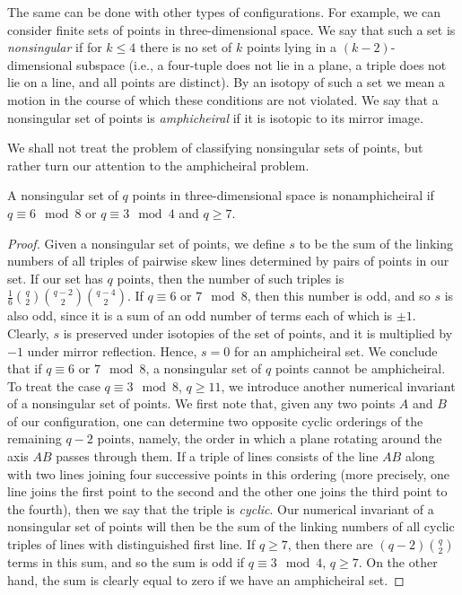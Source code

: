\documentclass{article}
\begin{document}
The same can be done with other types of configurations. For example, we can
consider finite sets of points in three-dimensional space. We say that such a
set is {\it nonsingular\/} if for $k\le 4$ there is no set of $k$ points lying
in a $(k-2)$-dimensional subspace (i.e., a four-tuple does not lie in a plane,
a triple does not lie on a line, and all points are distinct). By an isotopy of
such a set we mean a motion in the course of which these conditions are not
violated. We say that a nonsingular set of points is {\it 
amphicheiral\/} if it is isotopic to its mirror image.

We shall not treat the problem of classifying nonsingular sets of points, but
rather turn our attention to the amphicheiral problem.

\begin{Th} 
 A nonsingular set of $q$ points in 
three-dimensional space is
nonamphicheiral if $q\equiv 6\mod8$ or $q\equiv3\mod4$ and
$q\ge7$.
\end{Th}

\begin{proof} Given a nonsingular set of points, we define $s$ to be 
the sum of
the linking numbers of all triples of pairwise skew lines determined by
pairs of points in our set. If our set has $q$ points, then the number of such
triples is $\frac16\binom{q}{2}\binom{q-2}{2}\binom{q-4}{2}$. If
$q\equiv 6$ or $7\mod8$, then this number is odd, and so $s$ is also
odd, since it is a sum of an odd number of terms each of which is $\pm1$.
Clearly, $s$ is preserved under isotopies of the set of points, and it is
multiplied by $-1$ under mirror reflection. Hence, $s=0$ for an 
amphicheiral set. We
conclude that if $q\equiv 6$ or $7\mod8$, a nonsingular set of $q$
points cannot be amphicheiral. To treat the case $q\equiv 3\mod8$, 
$q\ge11$, we introduce another numerical invariant of a
nonsingular set of points. We first note that, given any two points $A$ and $B$
of our configuration, one can determine two opposite cyclic orderings of the
remaining $q-2$ points, namely, the order in which a plane rotating around the
axis $AB$ passes through them. If a triple of lines consists of the line $AB$
along with two lines joining four successive points in this ordering (more
precisely, one line joins the first point to the second and the other one joins
the third point to the fourth), then we say that the triple is {\it cyclic\/}.
Our numerical invariant of a nonsingular set of points will then be the sum of
the linking numbers of all cyclic triples of lines with distinguished
first line. If $q\ge7$, then there are $(q-2)\binom{q}{2}$ terms in this sum,
and so the sum is odd if $q\equiv 3\mod4$, $q\ge7$. On the other
hand, the sum is clearly equal to zero if we have an amphicheiral 
set. \end{proof}
\end{document}
